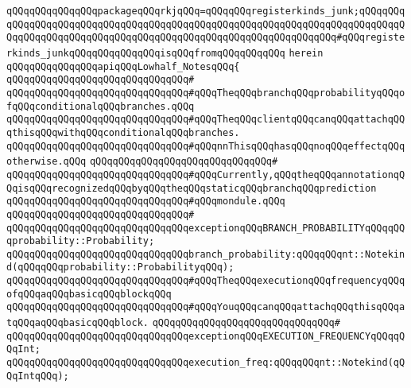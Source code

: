 \verb|qQQqqQQqqQQqqQQqpackageqQQqrkjqQQq=qQQqqQQqregisterkinds_junk;qQQqqQQqqQQqqQQqqQQqqQQqqQQqqQQqqQQqqQQqqQQqqQQqqQQqqQQqqQQqqQQqqQQqqQQqqQQqqQQqqQQqqQQqqQQqqQQqqQQqqQQqqQQqqQQqqQQqqQQqqQQqqQQqqQQqqQQq#qQQqregisterkinds_junkqQQqqQQqqQQqqQQqisqQQqfromqQQqqQQqqQQq|\newline
\verb|herein|\newline
\newline
\verb|qQQqqQQqqQQqqQQqapiqQQqLowhalf_NotesqQQq{|\newline
\verb|qQQqqQQqqQQqqQQqqQQqqQQqqQQqqQQq#|\newline
\verb|qQQqqQQqqQQqqQQqqQQqqQQqqQQqqQQq#qQQqTheqQQqbranchqQQqprobabilityqQQqofqQQqconditionalqQQqbranches.qQQq|\newline
\verb|qQQqqQQqqQQqqQQqqQQqqQQqqQQqqQQq#qQQqTheqQQqclientqQQqcanqQQqattachqQQqthisqQQqwithqQQqconditionalqQQqbranches.|\newline
\verb|qQQqqQQqqQQqqQQqqQQqqQQqqQQqqQQq#qQQqnnThisqQQqhasqQQqnoqQQqeffectqQQqotherwise.qQQq|\newline
\verb|qQQqqQQqqQQqqQQqqQQqqQQqqQQqqQQq#|\newline
\verb|qQQqqQQqqQQqqQQqqQQqqQQqqQQqqQQq#qQQqCurrently,qQQqtheqQQqannotationqQQqisqQQqrecognizedqQQqbyqQQqtheqQQqstaticqQQqbranchqQQqprediction|\newline
\verb|qQQqqQQqqQQqqQQqqQQqqQQqqQQqqQQq#qQQqmondule.qQQq|\newline
\verb|qQQqqQQqqQQqqQQqqQQqqQQqqQQqqQQq#|\newline
\verb|qQQqqQQqqQQqqQQqqQQqqQQqqQQqqQQqexceptionqQQqBRANCH_PROBABILITYqQQqqQQqprobability::Probability;|\newline
\verb|qQQqqQQqqQQqqQQqqQQqqQQqqQQqqQQqbranch_probability:qQQqqQQqnt::Notekind(qQQqqQQqprobability::ProbabilityqQQq);|\newline
\newline
\verb|qQQqqQQqqQQqqQQqqQQqqQQqqQQqqQQq#qQQqTheqQQqexecutionqQQqfrequencyqQQqofqQQqaqQQqbasicqQQqblockqQQq|\newline
\verb|qQQqqQQqqQQqqQQqqQQqqQQqqQQqqQQq#qQQqYouqQQqcanqQQqattachqQQqthisqQQqatqQQqaqQQqbasicqQQqblock.|\newline
\verb|qQQqqQQqqQQqqQQqqQQqqQQqqQQqqQQq#|\newline
\verb|qQQqqQQqqQQqqQQqqQQqqQQqqQQqqQQqexceptionqQQqEXECUTION_FREQUENCYqQQqqQQqInt;|\newline
\verb|qQQqqQQqqQQqqQQqqQQqqQQqqQQqqQQqexecution_freq:qQQqqQQqnt::Notekind(qQQqIntqQQq);|\newline
